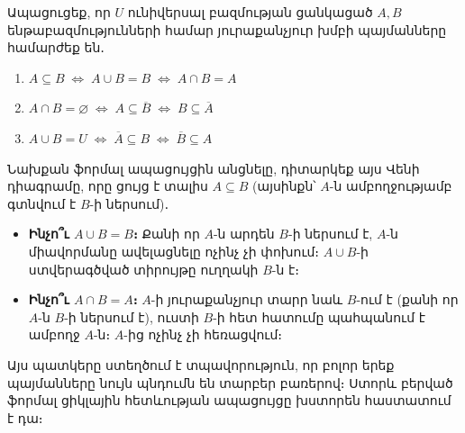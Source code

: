 \documentclass[12pt, a4paper]{article}
\newcommand{\comp}[1]{\overline{#1}}
\begin{document}
\begin{problembox}
Ապացուցեք, որ $U$ ունիվերսալ բազմության ցանկացած $A, B$ ենթաբազմությունների համար
յուրաքանչյուր խմբի պայմանները համարժեք են․
\begin{enumerate}[nosep]
  \item $A \subseteq B \;\iff\; A \cup B = B \;\iff\; A \cap B = A$
  \item $A \cap B = \varnothing \;\iff\; A \subseteq \comp{B} \;\iff\; B \subseteq \comp{A}$
  \item $A \cup B = U \;\iff\; \comp{A} \subseteq B \;\iff\; \comp{B} \subseteq A$
\end{enumerate}
\end{problembox}

\begin{tcolorbox}[colback=theoryBg, colframe=theoryFrame!80!black, arc=2mm, left=5pt, right=5pt, top=5pt, bottom=5pt, title={\small Տեսողական ինտուիցիա. Ինչո՞ւ են այս պայմանները համարժեք}]
Նախքան ֆորմալ ապացույցին անցնելը, դիտարկեք այս Վենի դիագրամը, որը ցույց է տալիս $A \subseteq B$ (այսինքն՝ $A$-ն ամբողջությամբ գտնվում է $B$-ի ներսում)․

\begin{center}
\end{center}

\begin{itemize}[nosep]
  \item \textbf{Ինչո՞ւ $A \cup B = B$։} Քանի որ $A$-ն արդեն $B$-ի ներսում է, $A$-ն միավորմանը ավելացնելը ոչինչ չի փոխում։ $A \cup B$-ի ստվերագծված տիրույթը ուղղակի $B$-ն է։
  \item \textbf{Ինչո՞ւ $A \cap B = A$։} $A$-ի յուրաքանչյուր տարր նաև $B$-ում է (քանի որ $A$-ն $B$-ի ներսում է), ուստի $B$-ի հետ հատումը պահպանում է ամբողջ $A$-ն։ $A$-ից ոչինչ չի հեռացվում։
\end{itemize}

Այս պատկերը ստեղծում է տպավորություն, որ բոլոր երեք պայմանները նույն պնդումն են տարբեր բառերով։ Ստորև բերված ֆորմալ ցիկլային հետևության ապացույցը խստորեն հաստատում է դա։
\end{tcolorbox}

\end{document}
